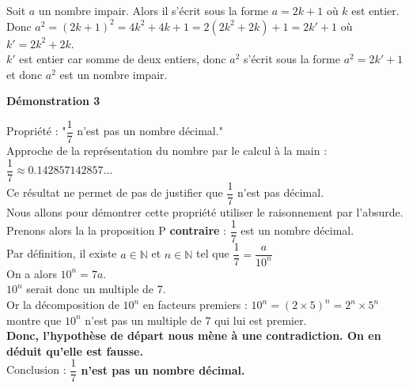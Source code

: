 \documentclass[a4paper,12pt]{article}
\newcommand{\N}{\mathbb{N}}
\begin{document}
Soit $a$ un nombre impair. Alors il s'écrit sous la forme $a=2k+1$ où $k$ est entier.\\
Donc $a^{2}=(2k+1)^{2}=4k^{2}+4k+1=2(2k^{2}+2k)+1=2k'+1$ où $k'=2k^{2}+2k$.\\
$k'$ est entier car somme de deux entiers, donc $a^{2}$ s’écrit sous la forme $a^{2}=2k'+1$ et donc $a^{2}$ est un nombre impair.\\



\vspace*{1.5cm}

\begin{large}
\textbf{Démonstration 3}\\
\end{large}
Propriété : "$\dfrac{1}{7}$ n'est pas un nombre décimal."\\



Approche de la représentation du nombre par le calcul à la main : $\dfrac{1}{7}\approx 0.142857142857...$\\
Ce résultat ne permet de pas de justifier que $\dfrac{1}{7}$ n'est pas décimal.\\

Nous allons pour démontrer cette propriété utiliser le raisonnement par l'absurde.\\

Prenons alors la la proposition P \textbf{contraire} : $\dfrac{1}{7}$ est un nombre décimal.\\
Par définition, il existe $a \in \N$ et $n \in \N$ tel que $\dfrac{1}{7}=\dfrac{a}{10^{n}}$\\
On a alors $10^{n}=7a$.\\
$10^{n}$ serait donc un multiple de 7.\\
Or la décomposition de $10^{n}$ en facteurs premiers : $10^{n}=(2\times5)^{n}=2^{n} \times 5^{n}$ montre que $10^{n}$ n'est pas un multiple de 7 qui lui est premier. \\
\textbf{Donc, l'hypothèse de départ nous mène à une contradiction. On en déduit qu'elle est fausse.}\\

Conclusion : \textbf{$\dfrac{1}{7}$ n'est pas un nombre décimal.}
\end{document}
